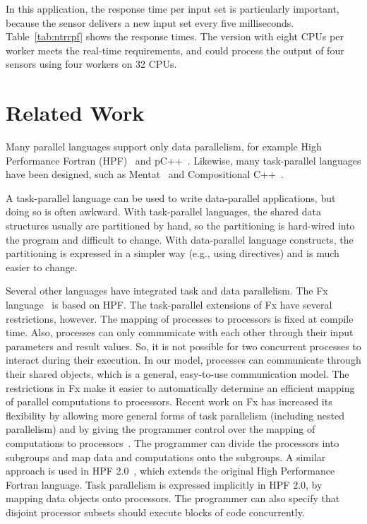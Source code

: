 \documentclass{acmtrans2e}
\begin{document}
In this application, the response time per input set is particularly
important, because the sensor delivers a new input set every five milliseconds.
Table~\ref{tab:ntrrpf} shows the response times.
The version with eight CPUs per worker meets the real-time requirements,
and could process the output of four sensors using four workers on 32 CPUs.


\section{Related Work}
\label{sec:RelatedWork}

Many parallel languages support only data parallelism, for example
High Performance Fortran (HPF)~\cite{Loveman93} and
pC++~\cite{bodin93}. Likewise, many task-parallel languages have been
designed, such as Mentat~\cite{grimshaw93} and Compositional
C++~\cite{chandy92}.

A task-parallel language can be used to write data-parallel
applications, but doing so is often awkward. With task-parallel languages,
the shared data structures usually are partitioned by hand, so the partitioning
is hard-wired into the program and difficult to change.
With data-parallel language constructs, the partitioning is expressed in
a simpler way (e.g., using directives) and is much easier to change.

Several other languages have integrated task and data parallelism.
The Fx language~\cite{gross94} is based on HPF. The task-parallel
extensions of Fx have several restrictions, however. The mapping of
processes to processors is fixed at compile time. Also, processes can
only communicate with each other through their input parameters and
result values. So, it is not possible for two concurrent processes to
interact during their execution.  In our model, processes can
communicate through their shared objects, which is a general,
easy-to-use communication model.  The restrictions in Fx make it
easier to automatically determine an efficient mapping of parallel
computations to processors.
Recent work on Fx has increased its flexibility
by allowing more general forms of task parallelism
(including nested parallelism) 
and by giving the programmer control over the mapping
of computations to processors~\cite{Subhlok:1997}.
The programmer can divide the processors into subgroups and
map data and computations onto the subgroups.
A similar approach is used in HPF 2.0~\cite{hpf-2}, which extends
the original High Performance Fortran language.
Task parallelism is expressed implicitly in HPF 2.0,
by mapping data objects onto processors. The programmer can also specify
that disjoint processor subsets should execute blocks of code concurrently.
\end{document}
